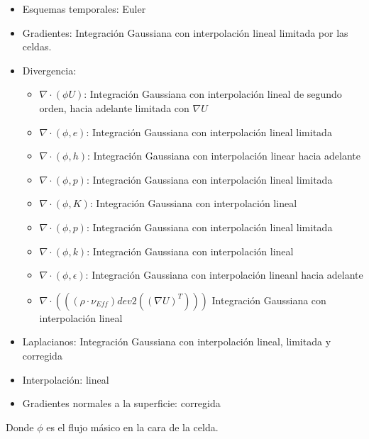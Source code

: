 \begin{itemize}
        \item Esquemas temporales: Euler
        \item Gradientes: Integración Gaussiana con interpolación lineal limitada por las celdas.
        \item Divergencia:
        \begin{itemize}
                \item $\nabla \cdot (\phi U)$: Integración Gaussiana con interpolación lineal de segundo orden, hacia adelante limitada con $\nabla U$
                \item $\nabla \cdot (\phi,e)$: Integración Gaussiana con interpolación lineal limitada
                \item $\nabla \cdot (\phi,h)$: Integración Gaussiana con interpolación linear hacia adelante
                \item $\nabla \cdot (\phi,p)$: Integración Gaussiana con interpolación lineal limitada
                \item $\nabla \cdot (\phi,K)$: Integración Gaussiana con interpolación lineal
                \item $\nabla \cdot (\phi,p)$: Integración Gaussiana con interpolación lineal limitada
                \item $\nabla \cdot (\phi,k)$: Integración Gaussiana con interpolación lineal
                \item $\nabla \cdot (\phi,\epsilon)$: Integración Gaussiana con interpolación lineanl hacia adelante
                \item $\nabla \cdot (((\rho\cdot \nu_{Eff}) dev2((\nabla U)^{T})))$ Integración Gaussiana con interpolación lineal
        \end{itemize}
        \item Laplacianos: Integración Gaussiana con interpolación lineal, limitada y corregida
        \item Interpolación: lineal
        \item Gradientes normales a la superficie: corregida
\end{itemize}

Donde $\phi$ es el flujo másico en la cara de la celda.

